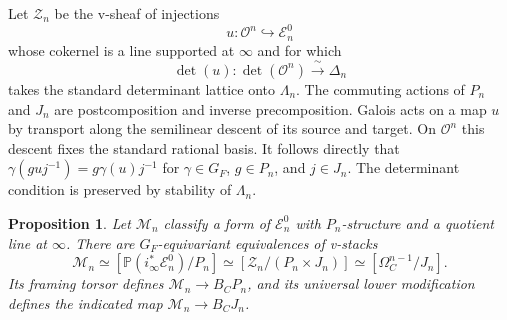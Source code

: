 \documentclass[11pt]{article}
\numberwithin{equation}{section}
\newtheorem{proposition}[theorem]{Proposition}
\theoremstyle{definition}
\theoremstyle{remark}
\begin{document}
Let $\mathcal Z_n$ be the v-sheaf of injections
\[
 u:\mathcal O^n\hookrightarrow\mathcal E_n^0
\]
whose cokernel is a line supported at $\infty$ and for which
\[
 \det(u):\det(\mathcal O^n)\xrightarrow{\ \sim\ }\Delta_n
\]
takes the standard determinant lattice onto $\Lambda_n$.
The commuting actions of $P_n$ and $J_n$ are postcomposition and
inverse precomposition.
Galois acts on a map $u$ by transport along the semilinear descent of
its source and target.  On $\mathcal O^n$ this descent fixes the standard
rational basis.  It follows directly that $\gamma(guj^{-1})
=g\gamma(u)j^{-1}$ for $\gamma\in G_F$, $g\in P_n$, and $j\in J_n$.
The determinant condition is preserved by stability of $\Lambda_n$.

\begin{proposition}\label{prop:two-realizations}
Let $\mathcal M_n$ classify a form of $\mathcal E_n^0$ with
$P_n$-structure and a quotient line at $\infty$.  There are
$G_F$-equivariant equivalences of v-stacks
\begin{equation}\label{eq:two-realizations}
 \mathcal M_n
 \simeq [\mathbb P(i_\infty^*\mathcal E_n^0)/P_n]
 \simeq [\mathcal Z_n/(P_n\times J_n)]
 \simeq [\Omega_C^{n-1}/J_n].
\end{equation}
Its framing torsor defines $\mathcal M_n\to B_CP_n$, and its universal
lower modification defines the indicated map $\mathcal M_n\to B_CJ_n$.
\end{proposition}
\end{document}

